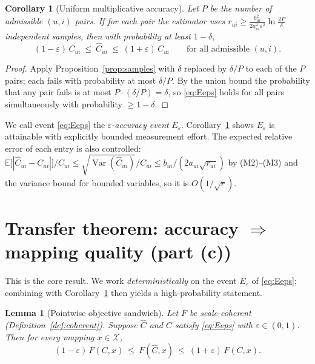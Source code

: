 \documentclass{amsart}
\newtheorem{lemma}{Lemma}
\newtheorem{corollary}{Corollary}
\theoremstyle{definition}
\newcommand{\Chat}{\widehat{C}}
\newcommand{\E}{\mathbb{E}}
\begin{document}
\begin{corollary}[Uniform multiplicative accuracy]\label{cor:uniform}
Let $P$ be the number of admissible $(u,i)$ pairs. If for each pair the estimator
uses $r_{ui}\ge \frac{b_{ui}^2}{2a_{ui}^2\varepsilon^2}\ln\frac{2P}{\delta}$
independent samples, then with probability at least $1-\delta$,
\begin{equation}\label{eq:Eeps}
(1-\varepsilon)\,C_{ui}\ \le\ \Chat_{ui}\ \le\ (1+\varepsilon)\,C_{ui}
\qquad\text{for all admissible }(u,i).
\end{equation}
\end{corollary}

\begin{proof}
Apply Proposition~\ref{prop:samples} with $\delta$ replaced by $\delta/P$ to each
of the $P$ pairs; each fails with probability at most $\delta/P$. By the union
bound the probability that any pair fails is at most $P\cdot(\delta/P)=\delta$, so
\eqref{eq:Eeps} holds for all pairs simultaneously with probability $\ge1-\delta$.
\end{proof}

We call event \eqref{eq:Eeps} the \emph{$\varepsilon$-accuracy event}
$E_\varepsilon$. Corollary~\ref{cor:uniform} shows $E_\varepsilon$ is attainable
with explicitly bounded measurement effort. The expected relative error of each
entry is also controlled: $\E\big[|\Chat_{ui}-C_{ui}|\big]/C_{ui}
\le \sqrt{\operatorname{Var}(\Chat_{ui})}/C_{ui}
\le b_{ui}/(2 a_{ui}\sqrt{r_{ui}})$ by (M2)--(M3) and the variance bound for
bounded variables, so it is $O(1/\sqrt{r})$.

\section{Transfer theorem: accuracy $\Rightarrow$ mapping quality (part (c))}\label{sec:transfer}

This is the core result. We work \emph{deterministically} on the event
$E_\varepsilon$ of \eqref{eq:Eeps}; combining with Corollary~\ref{cor:uniform}
then yields a high-probability statement.

\begin{lemma}[Pointwise objective sandwich]\label{lem:sandwich}
Let $F$ be scale-coherent (Definition~\ref{def:coherent}). Suppose $\Chat$ and
$C$ satisfy \eqref{eq:Eeps} with $\varepsilon\in(0,1)$. Then for every mapping
$x\in\mathcal{X}$,
\begin{equation}\label{eq:sandwich}
(1-\varepsilon)\,F(C,x)\ \le\ F(\Chat,x)\ \le\ (1+\varepsilon)\,F(C,x).
\end{equation}
\end{lemma}
\end{document}
